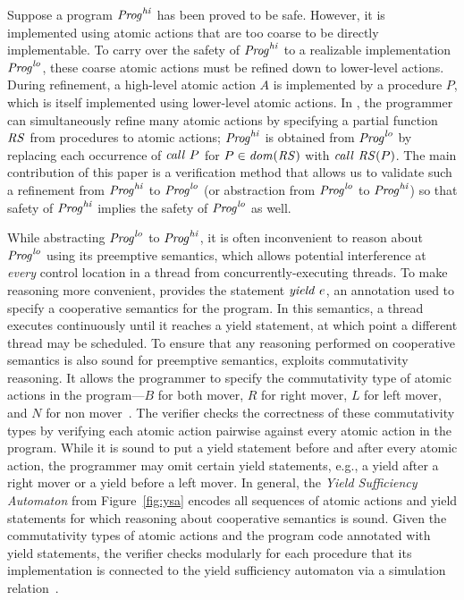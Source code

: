 \newcommand{\hi}{\mathit{hi}}
\newcommand{\lo}{\mathit{lo}}

Suppose a program $\Prog^\hi$ has been proved to be safe.
However, it is implemented using atomic actions that are too coarse to be directly implementable.  
To carry over the safety of $\Prog^\hi$ to a realizable implementation $\Prog^\lo$, 
these coarse atomic actions must be refined down to lower-level actions.
During refinement, a high-level atomic action $A$ is implemented by a procedure $P$, which is itself implemented using lower-level atomic actions.
In \civl, the programmer can simultaneously refine many atomic actions by specifying a partial function $\mathit{RS}$ from procedures to atomic actions;
$\Prog^\hi$ is obtained from $\Prog^\lo$ by replacing each occurrence of $\mathit{call}\ P$ for $P \in \mathit{dom}(\mathit{RS})$ with $\mathit{call}\ \mathit{RS}(P)$.
The main contribution of this paper is a verification method that allows us to validate such a refinement from 
$\Prog^\hi$ to $\Prog^\lo$ (or abstraction from $\Prog^\lo$ to $\Prog^\hi$) so that 
safety of $\Prog^\hi$ implies the safety of $\Prog^\lo$ as well.

While abstracting $\Prog^\lo$ to $\Prog^\hi$, it is often inconvenient to 
reason about $\Prog^\lo$ using its preemptive semantics, which allows potential interference 
at {\em every\/} control location in a thread from concurrently-executing threads.
To make reasoning more convenient, \civl provides the statement $\mathit{yield}\ e$, an annotation 
used to specify a cooperative semantics for the program.
In this semantics, a thread executes continuously until it reaches a yield statement, 
at which point a different thread may be scheduled.
To ensure that any reasoning performed on cooperative semantics is also sound for preemptive semantics,
\civl exploits commutativity reasoning.
It allows the programmer to specify 
the commutativity type of atomic actions in the program---$B$ for both mover, $R$ for right mover, $L$ for left mover, 
and $N$ for non mover~\cite{FlanaganFLQ08}. 
The \civl verifier checks the correctness of these commutativity types by verifying each atomic action pairwise against 
every atomic action in the program.
While it is sound to put a yield statement before and after every atomic action,
the programmer may omit certain yield statements, e.g., a yield after a right mover or a yield before a left mover.
In general, the {\em Yield Sufficiency Automaton\/} from Figure~\ref{fig:ysa} encodes 
all sequences of atomic actions and yield statements for which reasoning about cooperative semantics is sound.
Given the commutativity types of atomic actions and the program code annotated with yield statements,
the \civl verifier checks modularly for each procedure that its implementation is connected to the yield sufficiency automaton
via a simulation relation~\cite{HenzingerHK95}.

